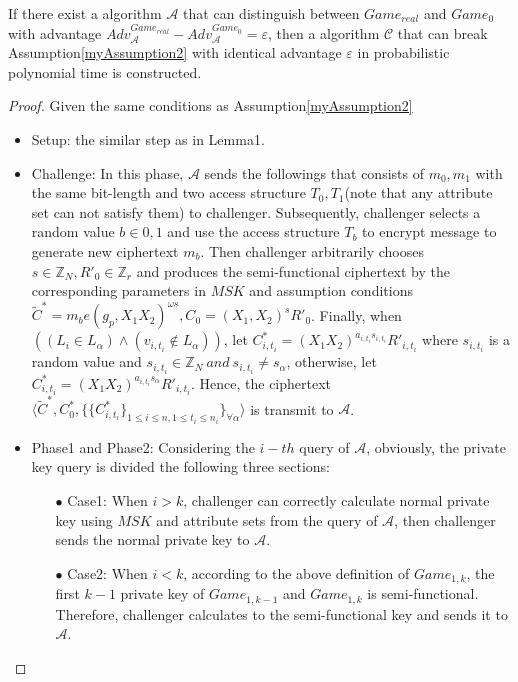 \documentclass[smallextended]{svjour3}       %
\begin{document}
\begin{myLemma}
	If there exist a algorithm $\mathcal{A}$ that can distinguish between $Game_{real}$ and $Game_{0}$ with advantage $Adv_{\mathcal{A}}^{Game_{real}}-Adv_{\mathcal{A}}^{Game_0}=\varepsilon$, then a algorithm $\mathcal{C}$ that can break Assumption\ref{myAssumption2} with identical advantage $\varepsilon$ in probabilistic polynomial time is constructed.	
\end{myLemma}
\begin{proof}
	Given the same conditions as Assumption\ref{myAssumption2}
	\begin{itemize}
		\item Setup: the similar step as in Lemma1.
		\item Challenge: In this phase, $\mathcal{A}$ sends the followings that consists of $m_0,m_1$ with the same bit-length and two access structure $T_0,T_1$(note that any attribute set can not satisfy them) to challenger. Subsequently, challenger selects a random value $b \in {0,1}$ and use the access structure $T_b$ to encrypt message to generate new ciphertext $m_b$. Then challenger arbitrarily chooses $s \in \mathbb{Z}_N,R'_0 \in \mathbb{Z}_r$ and produces the semi-functional ciphertext by the corresponding parameters in $MSK$ and assumption conditions $\tilde{C}^*=m_be(g_p,X_1X_2)^{\omega s}, C_0 = (X_1,X_2)^sR'_0$. Finally, when $((L_i \in L_\alpha)\wedge(v_{i,t_i} \notin L_\alpha))$, let $C^{*}_{i,t_i}=(X_1X_2)^{a_{i,t_i}s_{i,t_i}}R'_{i,t_i}$ where $s_{i,t_i}$ is a random value and $s_{i,t_i} \in \mathbb{Z}_N \ and \ s_{i,t_i} \neq s_\alpha$, otherwise, let $C^{*}_{i,t_i}=(X_1X_2)^{a_{i,t_i}s_\alpha}R'_{i,t_i}$. Hence, the ciphertext $\langle \tilde{C}^*, C_0^*, \{\{C^*_{i,t_i}\}_{1 \leq i \leq n, 1 \leq t_i \leq n_i}\}_{\forall \alpha}\rangle$ is transmit to $\mathcal{A}$. 
		\item Phase1 and Phase2: Considering the $i-th$ query of $\mathcal{A}$, obviously, the private key query is divided the following three sections: 
		\begin{itemize}
			\item[$\bullet$] Case1: When $i>k$, challenger can correctly calculate normal private key using $MSK$ and attribute sets from the query of $\mathcal{A}$, then challenger sends the normal private key to $\mathcal{A}$.
			\item[$\bullet$] Case2: When $i<k$, according to the above definition of $Game_{1,k}$, the first $k-1$ private key of $Game_{1,k-1}$ and $Game_{1,k}$ is semi-functional. Therefore, challenger calculates to the semi-functional key and sends it to $\mathcal{A}$.

\end{itemize}
\end{itemize}
\end{proof}
\end{document}
